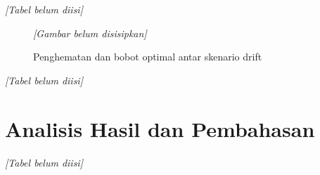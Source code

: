         \begin{table}[H]
            \centering
            \caption{Penghematan dan alokasi bobot antar skenario drift}\label{tab:drift scenarios}
            \textit{[Tabel belum diisi]}
        \end{table}

        \begin{figure}[H]
            \centering
            \textit{[Gambar belum disisipkan]}
            \caption{Penghematan dan bobot optimal antar skenario drift}\label{fig:drift}
        \end{figure}

        \begin{table}[H]
            \centering
            \caption{Perbandingan jendela data \textit{intersection} dan \textit{spline}}\label{tab:data window}
            \textit{[Tabel belum diisi]}
        \end{table}

    \section{Analisis Hasil dan Pembahasan}\label{sec:discussion}

        \begin{table}[H]
            \centering
            \caption{Perbandingan portofolio eksisting 2024 dan hasil optimasi tiap algoritma}\label{tab:existing vs optimized}
            \textit{[Tabel belum diisi]}
        \end{table}


